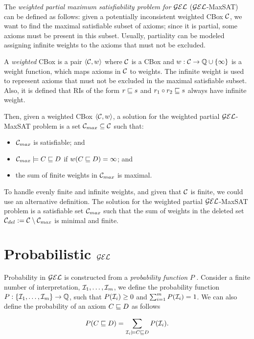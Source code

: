 The \emph{weighted partial maximum satisfiability problem for} $\mathcal{GEL}$ ($\mathcal{GEL}$-MaxSAT) can be defined as follows: given a potentially inconsistent weighted CBox $\mathcal{C}$, we want to find the maximal satisfiable subset of axioms; since it is partial, some axioms must be present in this subset. Usually, partiality can be modeled assigning infinite weights to the axioms that must not be excluded.

A \emph{weighted} CBox is a pair $\langle\mathcal{C}, w\rangle$ where $\mathcal{C}$ is a CBox and $w: \mathcal{C} \to \mathbb{Q} \cup \{\infty\}$ is a weight function, which maps axioms in $\mathcal{C}$ to weights. The infinite weight is used to represent axioms that must not be excluded in the maximal satisfiable subset. Also, it is defined that RIs of the form $r \sqsubseteq s$ and $r_1 \circ r_2 \sqsubseteq s$ always have infinite weight.

Then, given a weighted CBox $\langle\mathcal{C}, w\rangle$, a solution for the weighted partial $\mathcal{GEL}$-MaxSAT problem is a set $\mathcal{C}_{max} \subseteq \mathcal{C}$ such that:
\begin{itemize}
	\item $\mathcal{C}_{max}$ is satisfiable; and
	\item $\mathcal{C}_{max} \models C \sqsubseteq D$ if $w(C \sqsubseteq D) = \infty$; and
	\item the sum of finite weights in $\mathcal{C}_{max}$ is maximal.
\end{itemize}

To handle evenly finite and infinite weights, and given that $\mathcal{C}$ is finite, we could use an alternative definition. The solution for the weighted partial $\mathcal{GEL}$-MaxSAT problem is a satisfiable set $\mathcal{C}_{max}$ such that the sum of weights in the deleted set $\mathcal{C}_{del} := \mathcal{C} \setminus \mathcal{C}_{max}$ is minimal and finite.

\section{Probabilistic \texorpdfstring{$\mathcal{GEL}$}{GEL}}
\label{sec:pgel}

Probability in $\mathcal{GEL}$ is constructed from a \emph{probability function} $P$ \citep{Fin2020}. Consider a finite number of interpretation, $\mathcal{I}_1, \dots, \mathcal{I}_m$, we define the probability function $P: \{\mathcal{I}_1, \dots, \mathcal{I}_m\} \to \mathbb{Q}$, such that $P(\mathcal{I}_i) \geq 0$ and $\sum_{i = 1}^m P(\mathcal{I}_i) = 1$. We can also define the probability of an axiom $C \sqsubseteq D$ as follows

\[
	P(C \sqsubseteq D) = \sum_{\mathcal{I}_i \models C \sqsubseteq D} P(\mathcal{I}_i).
\]

